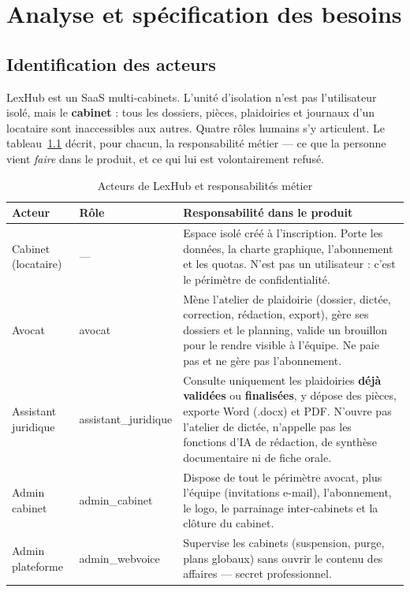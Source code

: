 \chapter{Analyse et spécification des besoins}
\label{ch:analyse}

\section{Identification des acteurs}

LexHub est un SaaS multi-cabinets. L'unité d'isolation n'est pas l'utilisateur isolé, mais le \textbf{cabinet} : tous les dossiers, pièces, plaidoiries et journaux d'un locataire sont inaccessibles aux autres. Quatre rôles humains s'y articulent. Le tableau~\ref{tab:acteurs} décrit, pour chacun, la responsabilité métier --- ce que la personne vient \emph{faire} dans le produit, et ce qui lui est volontairement refusé.

\begin{table}[H]
\centering
\caption{Acteurs de LexHub et responsabilités métier}
\label{tab:acteurs}
\small
\renewcommand{\arraystretch}{1.28}
\begin{tabular}{@{}>{\raggedright\arraybackslash}p{3.1cm}>{\ttfamily}l>{\raggedright\arraybackslash}p{7.4cm}@{}}
\toprule
\textbf{Acteur} & \textbf{Rôle} & \textbf{Responsabilité dans le produit} \\
\midrule
Cabinet (locataire) & --- &
Espace isolé créé à l'inscription. Porte les données, la charte graphique, l'abonnement et les quotas. N'est pas un utilisateur : c'est le périmètre de confidentialité. \\
\midrule
Avocat & avocat &
Mène l'atelier de plaidoirie (dossier, dictée, correction, rédaction, export), gère ses dossiers et le planning, valide un brouillon pour le rendre visible à l'équipe. Ne paie pas et ne gère pas l'abonnement. \\
\midrule
Assistant juridique & assistant\_juridique &
Consulte uniquement les plaidoiries \textbf{déjà validées} ou \textbf{finalisées}, y dépose des pièces, exporte Word (.docx) et PDF. N'ouvre pas l'atelier de dictée, n'appelle pas les fonctions d'IA de rédaction, de synthèse documentaire ni de fiche orale. \\
\midrule
Admin cabinet & admin\_cabinet &
Dispose de tout le périmètre avocat, plus l'équipe (invitations e-mail), l'abonnement, le logo, le parrainage inter-cabinets et la clôture du cabinet. \\
\midrule
Admin plateforme & admin\_webvoice &
Supervise les cabinets (suspension, purge, plans globaux) sans ouvrir le contenu des affaires --- secret professionnel. \\
\bottomrule
\end{tabular}
\end{table}

